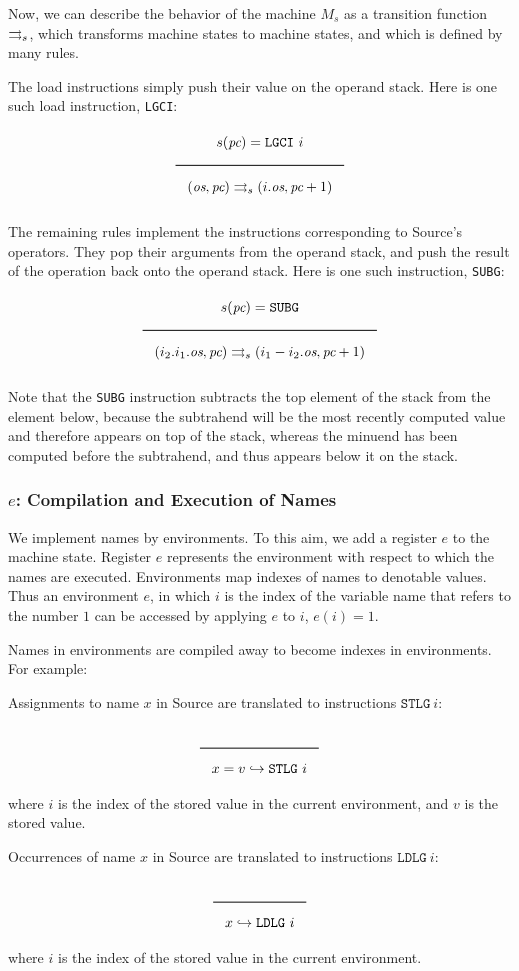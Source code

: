 \begin{appendices}
Now, we can describe the behavior of the machine \(M_s\) as a transition function \(\rightrightarrows_s\), which transforms machine states to machine states, and which is defined by many rules.

The load instructions simply push their value on the operand stack. Here is one such load instruction, \texttt{LGCI}:
$$\Rule{s(\textit{pc}) = \texttt{LGCI}\ i}{
(\textit{os},\textit{pc}) \transition (i.\textit{os},\textit{pc}+1)}$$

The remaining rules implement the instructions corresponding to Source's operators. They pop their arguments from the operand stack, and push the result of the operation back onto the operand stack. Here is one such instruction, \texttt{SUBG}:
$$\Rule{s(\textit{pc}) = \texttt{SUBG}}{
(i_2.i_1.\textit{os},\textit{pc}) \transition (i_1-i_2.\textit{os},\textit{pc}+1)}$$

Note that the \texttt{SUBG} instruction subtracts the top element of the stack from the element below, because the subtrahend will be the most recently computed value and therefore appears on top of the stack, whereas the minuend has been computed before the subtrahend, and thus appears below it on the stack.

\subsubsection{\(\textit{e}\): Compilation and Execution of Names}
\label{sec:orgf6063dd}
We implement names by environments. To this aim, we add a register \(e\) to the machine state. Register \(e\) represents the environment with respect to which the names are executed. Environments map indexes of names to denotable values. Thus an environment \(e\), in which \(i\) is the index of the variable name that refers to the number \(1\) can be accessed by applying \(e\) to \(i\), \(e(i) = 1\).

Names in environments are compiled away to become indexes in environments. For example:

Assignments to name \(x\) in Source are translated to instructions \(\texttt{STLG}\ i\):
$$\Rule{}{x = v \translateaux \texttt{STLG}\ i}$$
where \(i\) is the index of the stored value in the current environment, and \(v\) is the stored value.

Occurrences of name \(x\) in Source are translated to instructions \(\texttt{LDLG}\ i\):
$$\Rule{}{x \translateaux \texttt{LDLG}\ i}$$
where \(i\) is the index of the stored value in the current environment.


\end{appendices}
